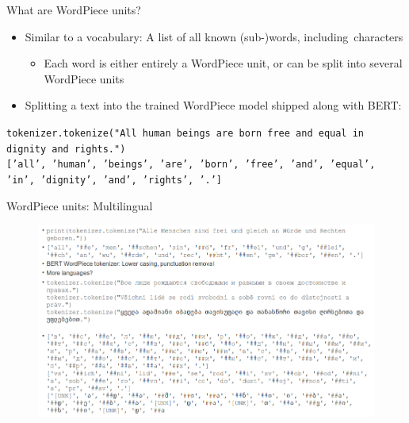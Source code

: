 \documentclass[12pt]{beamer}
\begin{document}
\begin{frame}{What are WordPiece units?}

\begin{itemize}
	\item Similar to a vocabulary: A list of all known (sub-)words, including characters
	\begin{itemize}
		\item Each word is either entirely a WordPiece unit, or can be split into several WordPiece units
	\end{itemize}
	\item Splitting a text into the trained WordPiece model shipped along with BERT:
\end{itemize}

\begin{small}
\texttt{tokenizer.tokenize("All human beings are born free and equal in dignity and rights.")}
\\
\texttt{['all', 'human', 'beings', 'are', 'born', 'free', 'and', 'equal', 'in', 'dignity', 'and', 'rights', '.']}
\end{small}

	
\end{frame}






\begin{frame}{WordPiece units: Multilingual}
	
\begin{figure}
	\includegraphics[width=\linewidth]{img/word-piece.png}
\end{figure}
	
\end{frame}
\end{document}
